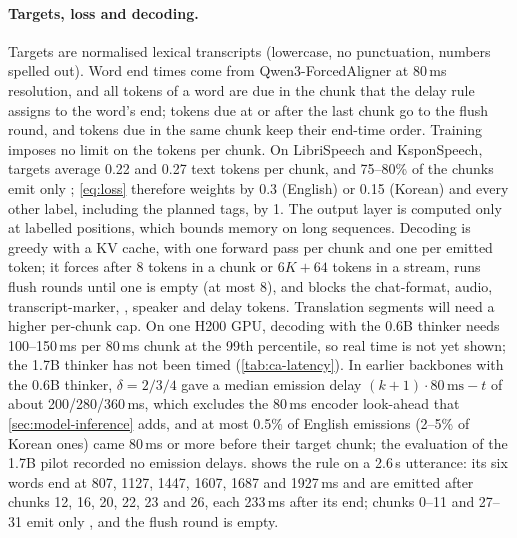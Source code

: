 \paragraph{Targets, loss and decoding.}
Targets are normalised lexical transcripts (lowercase, no punctuation, numbers spelled out). Word end times come from Qwen3-ForcedAligner \citep{shi2026qwen3asr} at 80\,ms resolution, and all tokens of a word are due in the chunk that the delay rule assigns to the word's end; tokens due at or after the last chunk go to the flush round, and tokens due in the same chunk keep their end-time order. Training imposes no limit on the tokens per chunk. On LibriSpeech and KsponSpeech, targets average 0.22 and 0.27 text tokens per chunk, and 75--80\% of the chunks emit only ; \cref{eq:loss} therefore weights  by 0.3 (English) or 0.15 (Korean) and every other label, including the planned tags, by 1. The output layer is computed only at labelled positions, which bounds memory on long sequences. Decoding is greedy with a KV cache, with one forward pass per chunk and one per emitted token; it forces  after 8 tokens in a chunk or $6K+64$ tokens in a stream, runs flush rounds until one is empty (at most 8), and blocks the chat-format, audio, transcript-marker, , speaker and delay tokens. Translation segments will need a higher per-chunk cap. On one H200 GPU, decoding with the 0.6B thinker needs 100--150\,ms per 80\,ms chunk at the 99th percentile, so real time is not yet shown; the 1.7B thinker has not been timed (\cref{tab:ca-latency}). In earlier backbones with the 0.6B thinker, $\delta=2/3/4$ gave a median emission delay $(k+1)\cdot80\,\mathrm{ms}-t$ of about 200/280/360\,ms, which excludes the 80\,ms encoder look-ahead that \cref{sec:model-inference} adds, and at most 0.5\% of English emissions (2--5\% of Korean ones) came 80\,ms or more before their target chunk; the evaluation of the 1.7B pilot recorded no emission delays.  shows the rule on a 2.6\,s utterance: its six words end at 807, 1127, 1447, 1607, 1687 and 1927\,ms and are emitted after chunks 12, 16, 20, 22, 23 and 26, each 233\,ms after its end; chunks 0--11 and 27--31 emit only , and the flush round is empty.

